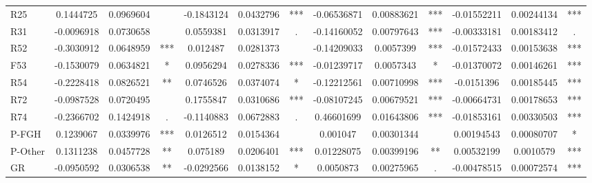 \documentclass[11pt,letterpaper]{article}
\numberwithin{equation}{section}
\numberwithin{equation}{section}
\numberwithin{equation}{section}
\begin{document}
\begin{center}
\begin{sideways}
\begin{tabular}{|l|ccc|ccc|ccc|ccc|}
R25       & 0.1444725  & 0.0969604 &     & -0.1843124 & 0.0432796 & *** & -0.06536871 & 0.00883621 & *** & -0.01552211 & 0.00244134 & *** \\
R31       & -0.0096918 & 0.0730658 &     & 0.0559381  & 0.0313917 & .   & -0.14160052 & 0.00797643 & *** & -0.00333181 & 0.00183412 & .   \\
R52       & -0.3030912 & 0.0648959 & *** & 0.012487   & 0.0281373 &     & -0.14209033 & 0.0057399  & *** & -0.01572433 & 0.00153638 & *** \\
F53       & -0.1530079 & 0.0634821 & *   & 0.0956294  & 0.0278336 & *** & -0.01239717 & 0.0057343  & *   & -0.01370072 & 0.00146261 & *** \\
R54       & -0.2228418 & 0.0826521 & **  & 0.0746526  & 0.0374074 & *   & -0.12212561 & 0.00710998 & *** & -0.0151396  & 0.00185445 & *** \\
R72       & -0.0987528 & 0.0720495 &     & 0.1755847  & 0.0310686 & *** & -0.08107245 & 0.00679521 & *** & -0.00664731 & 0.00178653 & *** \\
R74       & -0.2366702 & 0.1424918 & .   & -0.1140883 & 0.0672883 & .   & 0.46601699  & 0.01643806 & *** & -0.01853161 & 0.00330503 & *** \\
P-FGH     & 0.1239067  & 0.0339976 & *** & 0.0126512  & 0.0154364 &     & 0.001047    & 0.00301344 &     & 0.00194543  & 0.00080707 & *   \\
P-Other   & 0.1311238  & 0.0457728 & **  & 0.075189   & 0.0206401 & *** & 0.01228075  & 0.00399196 & **  & 0.00532199  & 0.0010579  & *** \\
GR        & -0.0950592 & 0.0306538 & **  & -0.0292566 & 0.0138152 & *   & 0.0050873   & 0.00275965 & .   & -0.00478515 & 0.00072574 & *** \\
\hline\hline
\end{tabular}
\end{sideways}
\end{center}



\end{document}

